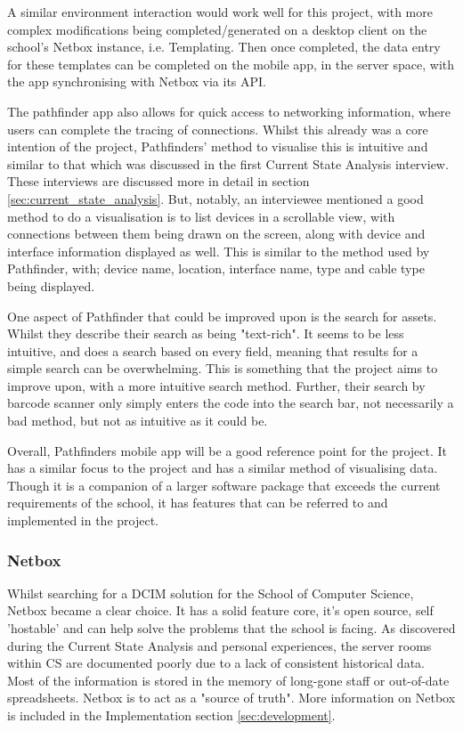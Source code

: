 \documentclass [11pt,a4paper]{article}
\begin{document}
A similar environment interaction would work well for this project, with more complex modifications being completed/generated on a desktop client on the school's Netbox instance, i.e. Templating. Then once completed, the data entry for these templates can be completed on the mobile app, in the server space, with the app synchronising with Netbox via its API. 

The pathfinder app also allows for quick access to networking information, where users can complete the tracing of connections. Whilst this already was a core intention of the project, Pathfinders' method to visualise this is intuitive and similar to that which was discussed in the first Current State Analysis interview. These interviews are discussed more in detail in section \ref{sec:current_state_analysis}. But, notably, an interviewee mentioned a good method to do a visualisation is to list devices in a scrollable view, with connections between them being drawn on the screen, along with device and interface information displayed as well. This is similar to the method used by Pathfinder, with; device name, location, interface name, type and cable type being displayed. 

One aspect of Pathfinder that could be improved upon is the search for assets. Whilst they describe their search as being "text-rich". It seems to be less intuitive, and does a search based on every field, meaning that results for a simple search can be overwhelming. This is something that the project aims to improve upon, with a more intuitive search method. Further, their search by barcode scanner only simply enters the code into the search bar, not necessarily a bad method, but not as intuitive as it could be. 

Overall, Pathfinders mobile app will be a good reference point for the project. It has a similar focus to the project and has a similar method of visualising data. Though it is a companion of a larger software package that exceeds the current requirements of the school, it has features that can be referred to and implemented in the project.

\subsubsection{Netbox}
\label{sec:netbox}
Whilst searching for a DCIM solution for the School of Computer Science, Netbox became a clear choice. It has a solid feature core, it's open source, self 'hostable' and can help solve the problems that the school is facing. As discovered during the Current State Analysis and personal experiences, the server rooms within CS are documented poorly due to a lack of consistent historical data. Most of the information is stored in the memory of long-gone staff or out-of-date spreadsheets. Netbox is to act as a "source of truth"\cite{Netbox}. More information on Netbox is included in the Implementation section \ref{sec:development}. 
\end{document}
